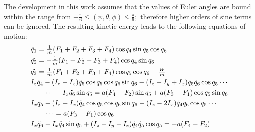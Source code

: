\documentclass[twocolumn,10pt]{asme2e}
\begin{document}
{%
The development in this work assumes that the values of Euler angles are bound within the range from $-\tfrac{\pi}{6}\le\left(\psi,\theta,\phi\right)\le \tfrac{\pi}{6};$ therefore higher orders of sine terms can be ignored. The resulting kinetic energy leads to the following equations of motion:
\begin{align}
&\ddot{q}_{1}=\tfrac{1}{m}(F_{1}+F_{2}+F_{3}+F_{4})\cos q_4 \sin q_5 \cos q_6\label{eom1}\\
&\ddot{q_{2}}=-\tfrac{1}{m}(F_{1}+F_{2}+F_{3}+F_{4})\cos q_4\sin q_6\\
&\ddot{q_{3}}=\tfrac{1}{m}(F_{1}+F_{2}+F_{3}+F_{4})\cos q_{5}\cos q_{6}-\tfrac{W}{m}\\
& I_{z}\ddot{q}_{4}-(I_z-I_{x})\ddot{q}_{5}\cos{q}_{5}\cos{q}_{6}\sin{q}_{6}-(I_z-I_y+I_x)\dot{q}_5\dot{q}_6\cos{q}_5\cdots\notag\\
&\qquad\cdots-I_{x}\ddot{q_{6}}\sin{q}_{5}=	a(F_{4}-F_{2})\sin q_5+ a(F_3-F_1)\cos q_5\sin q_6\\
&I_x\ddot{q}_5-(I_z-I_{x})\ddot{q}_{4}\cos{q}_{5}\cos{q}_{6}\sin{q}_{6}-(I_z-2I_{x})\dot{q}_{4}\dot{q}_{6}\cos{q}_{5}\cdots\notag\\
&\qquad\cdots=a(F_3-F_1)\cos q_6\\
&I_x\ddot{q}_6-I_{x}\ddot{q}_4\sin q_5+(I_z-I_y-I_x)\dot{q}_4\dot{q}_5\cos{q}_5=-a(F_{4}-F_2)\label{eom6}
\end{align}

}
\end{document}
